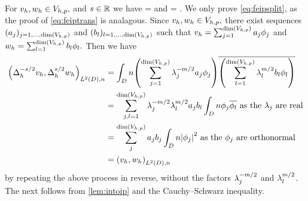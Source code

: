 


\label{lem:intoip}
For $v_{h}, w_{h} \in V_{h,p},$ and $s \in \mathbb R$ we have
\beq\label{eq:feipsplit}
\IPLtDn{\Deltahmst \vh}{\Deltahst \wh} = \IPLtDn{\vh}{\wh}
\eeq
and
\beq\label{eq:feiptrans}
\IPLtDn{\Deltahst \vh}{\Deltahst \vh} =  .
\eeq
\ele
{}
We only prove \cref{eq:feipsplit}, as the proof of \cref{eq:feiptrans} is analagous. Since $v_{h},w_{h} \in V_{h,p},$ there exist sequences $(\aj)_{j =1,\ldots,\dimVhp}$ and $(\bsl)_{l =1,\ldots,\dimVhp}$ such that $\vh = \sum_{j=1}^{\dimVhp} \aj\phij$ and $\wh = \sum_{l=1}^{\dimVhp} \bsl \phil.$ Then we have
\begin{align*}
\IPLtDn{\Deltahmst \vh}{\Deltahst \wh} &= \int_D n\mleft(\sum_{j=1}^{\dimVhp}\lambdaj^{-m/2} \aj\phij\mright)\overline{\mleft(\sum_{l=1}^{\dimVhp} \lambdal^{m/2}\bsl \phil\mright)}\\
&= \sum_{j,l=1}^{\dimVhp} \lambdaj^{-m/2} \lambdal^{m/2} \aj \bsl \int_D n \phij \philbar \text{ as the } \lambdaj \text{ are real}\\
& =\sum_{j}^{\dimVhp} \aj \bsj \int_D n\abs{\phij}^2 \text{ as the } \phij \text{ are orthonormal}\\
&= \IPLtDn{\vh}{\wh}
\end{align*}
by repeating the above process in reverse, without the factors $\lambda_{j}^{-m/2}$ and $\lambda_{l}^{m/2}$.
\epf
The next  follows from \cref{lem:intoip} and the Cauchy--Schwarz inequality.

